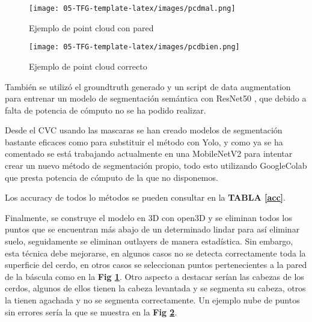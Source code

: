 \documentclass[12pt,a4paper]{article}
\begin{document}
\begin{figure}[!]
\centering
\texttt{[image: 05-TFG-template-latex/images/pcdmal.png]}
\caption{Ejemplo de point cloud con pared}
\label{pcdmal}
\end{figure}

\begin{figure}[!]
\centering
\texttt{[image: 05-TFG-template-latex/images/pcdbien.png]}
\caption{Ejemplo de point cloud correcto}
\label{pcdbien}
\end{figure}

También se utilizó el groundtruth generado y un script de data augmentation para entrenar un modelo de segmentación semántica con ResNet50 \cite{resnet}, que debido a falta de potencia de cómputo no se ha podido realizar.

Desde el CVC usando las mascaras se han creado modelos de segmentación bastante eficaces como para substituir el método con Yolo, y como ya se ha comentado se está trabajando actualmente en una MobileNetV2 para intentar crear un nuevo método de segmentación propio, todo esto utilizando GoogleColab que presta potencia de cómputo de la que no disponemos.




Los accuracy de todos lo métodos se pueden consultar en la \textbf{TABLA \ref{acc}}.





Finalmente, se construye el modelo en 3D con open3D \cite{open3D} y se eliminan todos los puntos que se encuentran más abajo de un determinado lindar para así eliminar suelo, seguidamente se eliminan outlayers de manera estadística. Sin embargo, esta técnica debe mejorarse, en algunos casos no se detecta correctamente toda la superficie del cerdo, en otros casos se seleccionan puntos pertenecientes a la pared de la báscula como en la \textbf{Fig \ref{pcdmal}}. Otro aspecto a destacar serían las cabezas de los cerdos, algunos de ellos tienen la cabeza levantada y se segmenta su cabeza, otros la tienen agachada y no se segmenta correctamente. Un ejemplo nube de puntos sin errores sería la que se muestra en la \textbf{Fig \ref{pcdbien}}.
\end{document}
